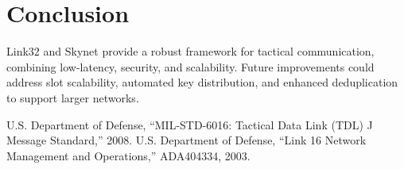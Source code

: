 \documentclass{article}
\begin{document}
\section{Conclusion}
Link32 and Skynet provide a robust framework for tactical communication, combining low-latency,
security, and scalability. Future improvements could address slot scalability, automated key
distribution, and enhanced deduplication to support larger networks.

\begin{thebibliography}{10}
 U.S. Department of Defense, ``MIL-STD-6016: Tactical Data Link (TDL) J Message Standard,'' 2008.
 U.S. Department of Defense, ``Link 16 Network Management and Operations,'' ADA404334, 2003.
\end{thebibliography}
\end{document}
